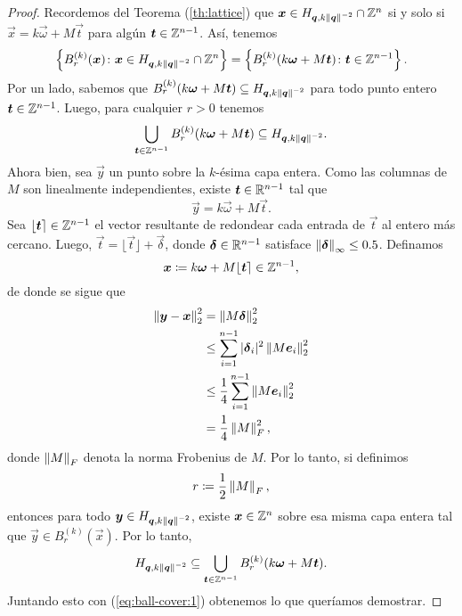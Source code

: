 \begin{proof}
	Recordemos del Teorema (\ref{th:lattice}) que $\boldsymbol{x} \in H_{\boldsymbol{q}, k\left\lVert \boldsymbol{q} \right\rVert^{-2}}
	\cap \mathbb{Z}^n$ si y solo si $\vec{x} = k\vec{\omega} + M\vec{t}$ para algún $\boldsymbol{t} \in \mathbb{Z}^{n-1}$.
	Así, tenemos
	\begin{equation*}
		\left\lbrace B_r^{(k)}(\boldsymbol{x}) \colon \boldsymbol{x} \in H_{\boldsymbol{q}, k\left\lVert \boldsymbol{q} \right\rVert^{-2}} \cap
			\mathbb{Z}^n \right\rbrace
			=
		\left\lbrace B_r^{(k)}(k\boldsymbol{\omega} + M\boldsymbol{t}) \colon \boldsymbol{t} \in \mathbb{Z}^{n-1} \right\rbrace.
	\end{equation*}
	Por un lado, sabemos que $B_r^{(k)}(k\boldsymbol{\omega} + M\boldsymbol{t}) \subseteq H_{\boldsymbol{q}, k\left\lVert \boldsymbol{q} \right\rVert^{-2}}$ para
	todo punto entero $\boldsymbol{t} \in \mathbb{Z}^{n-1}$. Luego, para cualquier $r > 0$ tenemos
	\begin{equation}
		\label{eq:ball-cover:1}
		\bigcup_{\boldsymbol{t} \in \mathbb{Z}^{n-1}}B_r^{(k)}(k\boldsymbol{\omega} + M\boldsymbol{t}) \subseteq
		H_{\boldsymbol{q}, k\left\lVert \boldsymbol{q} \right\rVert^{-2}}.
	\end{equation}
	Ahora bien, sea $\vec{y}$ un punto sobre la $k$-ésima capa entera. Como las columnas de $M$ son
	linealmente independientes, existe $\boldsymbol{t} \in \mathbb{R}^{n-1}$ tal que
	\begin{equation*}
		\vec{y} = k\vec{\omega} + M\vec{t}.
	\end{equation*}
	Sea $\lfloor \boldsymbol{t} \rceil \in \mathbb{Z}^{n-1}$ el vector resultante de redondear cada entrada de
	$\vec{t}$ al entero más cercano. Luego, $\vec{t} = \lfloor \vec{t} \rfloor + \vec{\delta}$,
	donde $\boldsymbol{\delta} \in \mathbb{R}^{n-1}$ satisface $\left\lVert \boldsymbol{\delta} \right\rVert_{\infty} \leq 0.5$. Definamos
	\begin{equation*}
		\boldsymbol{x} \coloneq k\boldsymbol{\omega} + M\lfloor \boldsymbol{t} \rceil \in \mathbb{Z}^{n-1},
	\end{equation*}
	de donde se sigue que
	\begin{align}
		\left\lVert \boldsymbol{y} - \boldsymbol{x} \right\rVert_2^{2} 
		&= \left\lVert M\boldsymbol{\delta} \right\rVert_{2}^{2} \nonumber \\
		&\leq \sum_{i=1}^{n-1}|\boldsymbol{\delta}_i|^2 \left\lVert M\boldsymbol{e}_i \right\rVert_2^{2} \nonumber \\
		&\leq \frac{1}{4}\sum_{i=1}^{n-1} \left\lVert M\boldsymbol{e}_i \right\rVert_2^{2} \label{eq:alt-M-bound} \\
		&= \frac{1}{4}\left\lVert M \right\rVert_F^2, \nonumber
	\end{align}
	donde $\left\lVert M \right\rVert_F$ denota la norma Frobenius de $M$. Por lo tanto, si definimos
	\begin{equation}
		\label{eq:radius}
		r \coloneq \frac{1}{2}\left\lVert M \right\rVert_F,
	\end{equation}
	entonces para todo $\boldsymbol{y} \in H_{\boldsymbol{q}, k\left\lVert \boldsymbol{q} \right\rVert^{-2}}$, existe $\boldsymbol{x} \in \mathbb{Z}^n$
	sobre esa misma capa entera tal que $\vec{y} \in B_r^{(k)}(\vec{x})$. Por lo tanto,
	\begin{equation}
		\label{eq:ball-cover:2}
		H_{\boldsymbol{q}, k\left\lVert \boldsymbol{q} \right\rVert^{-2}} \subseteq
		\bigcup_{\boldsymbol{t} \in \mathbb{Z}^{n-1}}B_r^{(k)}(k\boldsymbol{\omega} + M\boldsymbol{t}).
	\end{equation}
	Juntando esto con (\ref{eq:ball-cover:1}) obtenemos lo que queríamos demostrar.
\end{proof}

